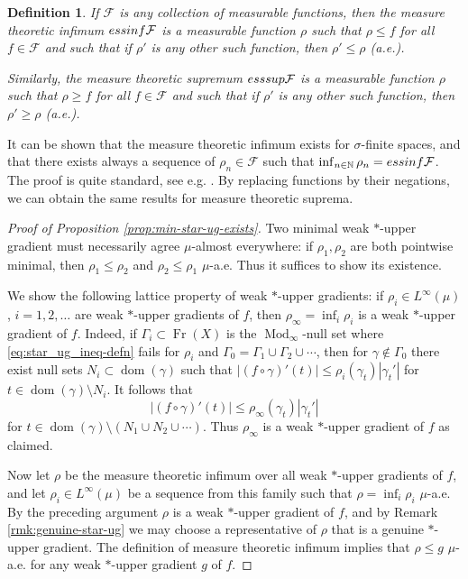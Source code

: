 \documentclass{amsart}
\newtheorem{definition}[theorem]{Definition}
\numberwithin{equation}{section}
\newcommand{\N}{\mathbb{N}}
\newcommand{\Mod}{\operatorname{Mod}}
\newcommand{\dom}{\operatorname{dom}}
\newcommand{\Fr}{\operatorname{Fr}}
\begin{document}
\begin{definition}\label{def:measinfsup}
If $\mathcal{F}$ is any collection of measurable functions, then the measure theoretic infimum ${\rm essinf} \mathcal{F}$ is a measurable function $\rho$ such that $\rho \leq f$ for all $f\in \mathcal{F}$ and such that if $\rho'$ is any other such function, then $\rho' \leq \rho$ (a.e.).

Similarly, the measure theoretic supremum ${\rm esssup} \mathcal{F}$ is a measurable function $\rho$ such that $\rho \geq f$ for all $f\in \mathcal{F}$ and such that if $\rho'$ is any other such function, then $\rho' \geq \rho$ (a.e.).
\end{definition}

It can be shown that the measure theoretic infimum exists for $\sigma$-finite spaces, and that there exists always a sequence of $\rho_n\in \mathcal{F}$ such that $\inf_{n\in \N} \rho_n = {\rm essinf} \mathcal{F}$. The proof is quite standard, see e.g. \cite[Appendix A.2, Essential supremum]{teriseb}. By replacing functions by their negations, we can obtain the same results for measure theoretic suprema.

\begin{proof}[Proof of Proposition \ref{prop:min-star-ug-exists}]
Two minimal weak $\ast$-upper gradient must necessarily agree $\mu$-almost everywhere: if $\rho_1,\rho_2$ are both pointwise minimal, then $\rho_1\le \rho_2$ and $\rho_2\le \rho_1$ $\mu$-a.e. Thus it suffices to show its existence. 

We show the following lattice property of weak $\ast$-upper gradients: if $\rho_i\in L^\infty(\mu)$, $i=1,2,\ldots$ are weak $\ast$-upper gradients of $f$, then $\rho_\infty=\inf_i\rho_i$ is a weak $\ast$-upper gradient of $f$. Indeed, if $\Gamma_i\subset \Fr(X)$ is the $\Mod_\infty$-null set where \eqref{eq:star_ug_ineq-defn} fails for $\rho_i$ and $\Gamma_0=\Gamma_1\cup\Gamma_2\cup\cdots$, then for $\gamma\notin \Gamma_0$ there exist null sets $N_i\subset \dom(\gamma)$ such that $|(f\circ\gamma)'(t)|\le \rho_i(\gamma_t)|\gamma_t'|$ for $t\in \dom(\gamma)\setminus N_i$. It follows that 
\[|(f\circ\gamma)'(t)|\le \rho_\infty(\gamma_t)|\gamma_t'|
\]
for $t\in \dom(\gamma)\setminus(N_1\cup N_2\cup\cdots)$. Thus $\rho_\infty$ is a weak $\ast$-upper gradient of $f$ as claimed.

Now let $\rho$ be the measure theoretic infimum over all weak $\ast$-upper gradients of $f$, and let $\rho_i\in L^\infty(\mu)$ be a sequence from this family such that $\rho=\inf_i\rho_i$ $\mu$-a.e. By the preceding argument $\rho$ is a weak $\ast$-upper gradient of $f$, and by Remark \ref{rmk:genuine-star-ug} we may choose a representative of $\rho$ that is a genuine $\ast$-upper gradient. The definition of measure theoretic infimum implies that $\rho\le g$ $\mu$-a.e. for any weak $\ast$-upper gradient $g$ of $f$.  
\end{proof}
\end{document}
